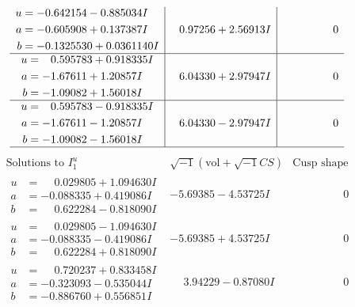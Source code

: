 \documentclass[1p]{elsarticle_modified}
\theoremstyle{definition}
\newcommand{\I}{\sqrt{-1}}
\begin{document}
$$\begin{array}{c|c|c}
\begin{aligned}
u &= -0.642154 - 0.885034 I \\
a &= -0.605908 + 0.137387 I \\
b &= -0.1325530 + 0.0361140 I\end{aligned}
 & \phantom{-}0.97256 + 2.56913 I & \phantom{-0.000000 } 0 \\ \hline\begin{aligned}
u &= \phantom{-}0.595783 + 0.918335 I \\
a &= -1.67611 + 1.20857 I \\
b &= -1.09082 + 1.56018 I\end{aligned}
 & \phantom{-}6.04330 + 2.97947 I & \phantom{-0.000000 } 0 \\ \hline\begin{aligned}
u &= \phantom{-}0.595783 - 0.918335 I \\
a &= -1.67611 - 1.20857 I \\
b &= -1.09082 - 1.56018 I\end{aligned}
 & \phantom{-}6.04330 - 2.97947 I & \phantom{-0.000000 } 0\\
 \hline 
 \end{array}$$\newpage$$\begin{array}{c|c|c}  
\text{Solutions to }I^u_{1}& \I (\text{vol} + \sqrt{-1}CS) & \text{Cusp shape}\\
 \hline 
\begin{aligned}
u &= \phantom{-}0.029805 + 1.094630 I \\
a &= -0.088335 + 0.419086 I \\
b &= \phantom{-}0.622284 - 0.818090 I\end{aligned}
 & -5.69385 - 4.53725 I & \phantom{-0.000000 } 0 \\ \hline\begin{aligned}
u &= \phantom{-}0.029805 - 1.094630 I \\
a &= -0.088335 - 0.419086 I \\
b &= \phantom{-}0.622284 + 0.818090 I\end{aligned}
 & -5.69385 + 4.53725 I & \phantom{-0.000000 } 0 \\ \hline\begin{aligned}
u &= \phantom{-}0.720237 + 0.833458 I \\
a &= -0.323093 - 0.535044 I \\
b &= -0.886760 + 0.556851 I\end{aligned}
 & \phantom{-}3.94229 - 0.87080 I & \phantom{-0.000000 } 0 \\ \hline\begin{aligned}

\end{aligned}
\end{array}$$
\end{document}
